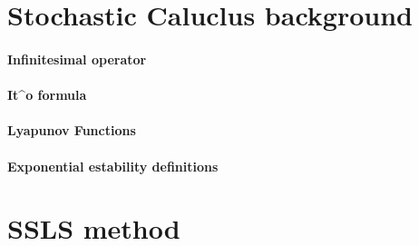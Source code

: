 
\section{Stochastic Caluclus background} 
	\paragraph{Infinitesimal operator}
	\paragraph{It^o formula}
	\paragraph{Lyapunov Functions}
	\paragraph{Exponential estability definitions}
\section{SSLS method}


